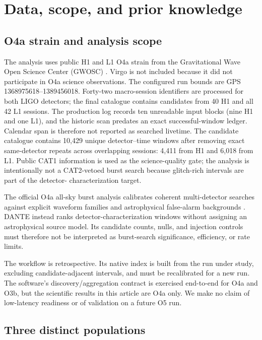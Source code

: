 \documentclass[aps,prd,twocolumn,superscriptaddress,nofootinbib,amsmath,amssymb,floatfix,10pt]{revtex4-2}
\begin{document}
\section{Data, scope, and prior knowledge}
\label{sec:data}

\subsection{O4a strain and analysis scope}

The analysis uses public H1 and L1 O4a strain from the Gravitational Wave Open
Science Center (GWOSC) \cite{gwosc_o4a_release,gwosc2023}.  Virgo is not included
because it did not participate in O4a science observations.  The configured
run bounds are GPS 1368975618--1389456018.  Forty-two macro-session identifiers
are processed for both LIGO detectors; the final catalogue contains candidates
from 40 H1 and all 42 L1 sessions.  The production log records ten unreadable
input blocks (nine H1 and one L1), and the historic scan predates an exact
successful-window ledger.  Calendar span is therefore not reported as searched
livetime.  The candidate
catalogue contains 10,429 unique detector--time windows after removing exact
same-detector repeats across overlapping sessions: 4,411 from H1 and 6,018
from L1.  Public CAT1 information is used
as the science-quality gate; the analysis is intentionally not a CAT2-vetoed
burst search because glitch-rich intervals are part of the detector-
characterization target.

The official O4a all-sky burst analysis calibrates coherent multi-detector
searches against explicit waveform families and astrophysical false-alarm
backgrounds \cite{lvk_burst_o4a}.  DANTE instead ranks detector-characterization
windows without assigning an astrophysical source model.  Its candidate counts,
nulls, and injection controls must therefore not be interpreted as burst-search
significance, efficiency, or rate limits.

The workflow is retrospective.  Its native index is built from the run under
study, excluding candidate-adjacent intervals, and must be recalibrated for a
new run.  The software's discovery/aggregation contract is exercised
end-to-end for O4a and O3b, but the scientific results in this article are O4a
only.  We make no claim of low-latency readiness or of validation on a future
O5 run.

\subsection{Three distinct populations}
\end{document}
